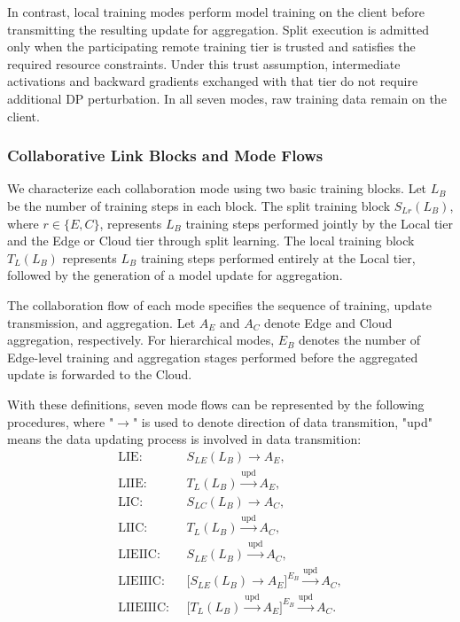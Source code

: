 \documentclass[5p,times]{elsarticle}
\theoremstyle{plain}
\theoremstyle{definition}
\theoremstyle{remark}
\begin{document}
In contrast, local training modes
perform model training on the client before
transmitting the resulting update for aggregation.
Split execution is admitted only when
the participating remote training tier
is trusted and satisfies the required
resource constraints. Under this trust
assumption, intermediate activations
and backward gradients exchanged with
that tier do not require additional
DP perturbation.
In all seven modes, raw training data remain
on the client.

\subsubsection{Collaborative Link Blocks and Mode Flows}
We characterize each collaboration mode using
two basic training blocks. Let \(L_B\) be the number of training steps in each block. The split training
block \(S_{Lr}(L_B)\), where \(r\in\{E,C\}\),
represents \(L_B\) training steps performed
jointly by the Local tier and the Edge or
Cloud tier through split learning. The local
training block \(T_L(L_B)\) represents
\(L_B\) training steps performed entirely
at the Local tier, followed by the generation
of a model update for aggregation.

The collaboration flow of each mode specifies
the sequence of training, update transmission,
and aggregation. Let \(A_E\) and \(A_C\)
denote Edge and Cloud aggregation, respectively.
For hierarchical modes, \(E_B\) denotes the
number of Edge-level training and aggregation
stages performed before the aggregated update
is forwarded to the Cloud.

With these definitions, seven mode flows can be represented by the following procedures, where "\(\to\)" is used to denote direction of data transmition, "upd" means the data updating process is involved in data transmition:
\begin{equation}
\begin{aligned}
\mathrm{LIE}:~~&
S_{LE}(L_B) \rightarrow A_E,\\
\mathrm{LIIE}:~~&
T_L(L_B) \xrightarrow{\mathrm{upd}} A_E,\\
\mathrm{LIC}:~~&
S_{LC}(L_B) \rightarrow A_C,\\
\mathrm{LIIC}:~~&
T_L(L_B) \xrightarrow{\mathrm{upd}} A_C,\\
\mathrm{LIEIIC}:~~&
S_{LE}(L_B)
\xrightarrow{\mathrm{upd}} A_C,\\
\mathrm{LIEIIIC}:~~&
\bigl[S_{LE}(L_B)\rightarrow A_E\bigr]^{E_B}
\xrightarrow{\mathrm{upd}} A_C,\\
\mathrm{LIIEIIIC}:~~&
\bigl[
T_L(L_B)
\xrightarrow{\mathrm{upd}} A_E
\bigr]^{E_B}
\xrightarrow{\mathrm{upd}} A_C .
\end{aligned}
\label{eq:mode_flows}
\end{equation}
\end{document}
